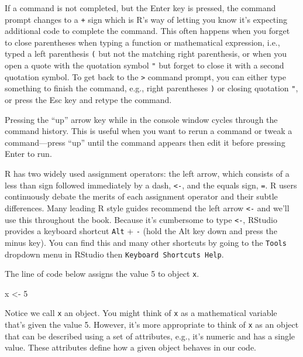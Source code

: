\documentclass[
  11pt,
]{krantz}
\newenvironment{Shaded}{\begin{snugshade}}{\end{snugshade}}
\newcommand{\DecValTok}[1]{\textcolor[rgb]{0.00,0.00,0.81}{#1}}
\newcommand{\NormalTok}[1]{#1}
\newcommand{\StringTok}[1]{\textcolor[rgb]{0.31,0.60,0.02}{#1}}
\theoremstyle{definition}
\theoremstyle{definition}
\theoremstyle{definition}
\theoremstyle{definition}
\theoremstyle{remark}
\begin{document}
If a command is not completed, but the Enter key is pressed, the command prompt changes to a \texttt{+} sign which is R's way of letting you know it's expecting additional code to complete the command. This often happens when you forget to close parentheses when typing a function or mathematical expression, i.e., typed a left parenthesis \texttt{(} but not the matching right parenthesis, or when you open a quote with the quotation symbol \texttt{"} but forget to close it with a second quotation symbol. To get back to the \texttt{\textgreater{}} command prompt, you can either type something to finish the command, e.g., right parentheses \texttt{)} or closing quotation \texttt{"}, or press the Esc key and retype the command.

Pressing the ``up'' arrow key while in the console window cycles through the command history. This is useful when you want to rerun a command or tweak a command---press ``up'' until the command appears then edit it before pressing Enter to run.

R has two widely used assignment operators: the left arrow, which consists of a less than sign followed immediately by a dash, \texttt{\textless{}-}, and the equals sign, \texttt{=}. R users continuously debate the merits of each assignment operator and their subtle differences. Many leading R style guides recommend the left arrow \texttt{\textless{}-} and we'll use this throughout the book. Because it's cumbersome to type \texttt{\textless{}-}, RStudio provides a keyboard shortcut \texttt{Alt} + \texttt{-} (hold the Alt key down and press the minus key). You can find this and many other shortcuts by going to the \texttt{Tools} dropdown menu in RStudio then \texttt{Keyboard\ Shortcuts\ Help}.

The line of code below assigns the value 5 to object \texttt{x}.

\begin{Shaded}
\begin{Highlighting}[]
\NormalTok{x \textless{}{-}}\StringTok{ }\DecValTok{5}
\end{Highlighting}
\end{Shaded}

Notice we call \texttt{x} an object. You might think of \texttt{x} as a mathematical variable that's given the value 5. However, it's more appropriate to think of \texttt{x} as an object that can be described using a set of attributes, e.g., it's numeric and has a single value. These attributes define how a given object behaves in our code.
\end{document}
